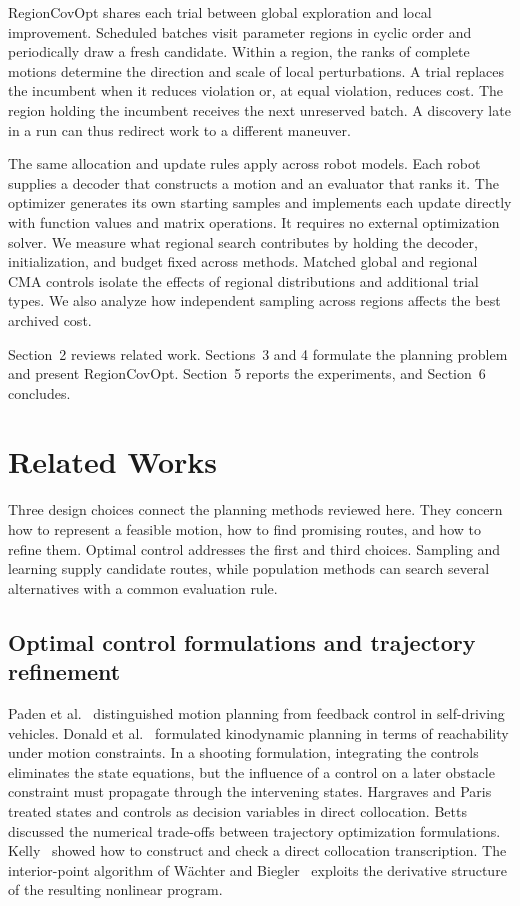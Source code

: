 \documentclass[a4paper]{cas-sc}
\begin{document}
RegionCovOpt shares each trial between global exploration and local improvement. Scheduled batches visit parameter regions in cyclic order and periodically draw a fresh candidate. Within a region, the ranks of complete motions determine the direction and scale of local perturbations. A trial replaces the incumbent when it reduces violation or, at equal violation, reduces cost. The region holding the incumbent receives the next unreserved batch. A discovery late in a run can thus redirect work to a different maneuver.

The same allocation and update rules apply across robot models. Each robot supplies a decoder that constructs a motion and an evaluator that ranks it. The optimizer generates its own starting samples and implements each update directly with function values and matrix operations. It requires no external optimization solver. We measure what regional search contributes by holding the decoder, initialization, and budget fixed across methods. Matched global and regional CMA controls isolate the effects of regional distributions and additional trial types. We also analyze how independent sampling across regions affects the best archived cost.

Section~2 reviews related work. Sections~3 and 4 formulate the planning problem and present RegionCovOpt. Section~5 reports the experiments, and Section~6 concludes.

\section{Related Works}
Three design choices connect the planning methods reviewed here. They concern how to represent a feasible motion, how to find promising routes, and how to refine them. Optimal control addresses the first and third choices. Sampling and learning supply candidate routes, while population methods can search several alternatives with a common evaluation rule.

\subsection{Optimal control formulations and trajectory refinement}
Paden et al.~\cite{survey} distinguished motion planning from feedback control in self-driving vehicles. Donald et al.~\cite{kino} formulated kinodynamic planning in terms of reachability under motion constraints. In a shooting formulation, integrating the controls eliminates the state equations, but the influence of a control on a later obstacle constraint must propagate through the intervening states. Hargraves and Paris~\cite{direct} treated states and controls as decision variables in direct collocation. Betts~\cite{betts} discussed the numerical trade-offs between trajectory optimization formulations. Kelly~\cite{kelly} showed how to construct and check a direct collocation transcription. The interior-point algorithm of W\"achter and Biegler~\cite{ipopt} exploits the derivative structure of the resulting nonlinear program.
\end{document}
